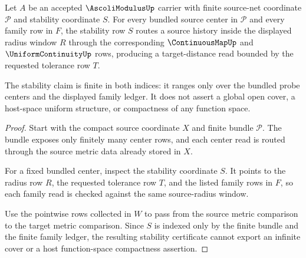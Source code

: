 \begin{theorem}
\label{thm:ascoli-modulus-finite-net-stability}
Let $A$ be an accepted $\AscoliModulusUp$ carrier with finite source-net coordinate $\mathcal{P}$ and stability coordinate $S$. For every bundled source center in $\mathcal{P}$ and every family row in $F$, the stability row $S$ routes a source history inside the displayed radius window $R$ through the corresponding $\ContinuousMapUp$ and $\UniformContinuityUp$ rows, producing a target-distance read bounded by the requested tolerance row $T$.

The stability claim is finite in both indices: it ranges only over the bundled probe centers and the displayed family ledger. It does not assert a global open cover, a host-space uniform structure, or compactness of any function space.
\end{theorem}
\begin{proof}
Start with the compact source coordinate $X$ and finite bundle $\mathcal{P}$. The bundle exposes only finitely many center rows, and each center read is routed through the source metric data already stored in $X$.

For a fixed bundled center, inspect the stability coordinate $S$. It points to the radius row $R$, the requested tolerance row $T$, and the listed family rows in $F$, so each family read is checked against the same source-radius window.

Use the pointwise rows collected in $W$ to pass from the source metric comparison to the target metric comparison. Since $S$ is indexed only by the finite bundle and the finite family ledger, the resulting stability certificate cannot export an infinite cover or a host function-space compactness assertion.
\end{proof}

